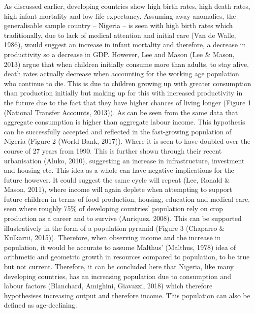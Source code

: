 \documentclass[11pt, english]{article}
\begin{document}
	As discussed earlier, developing countries show high birth rates, high death rates, high infant mortality and low life expectancy. Assuming away anomalies, the generalisable sample country – Nigeria – is seen with high birth rates which traditionally, due to lack of medical attention and initial care (Van de Walle, 1986), would suggest an increase in infant mortality and therefore, a decrease in productivity so a decrease in GDP. However, Lee and Mason (Lee \& Mason, 2013) argue that when children initially consume more than adults, to stay alive, death rates actually decrease when accounting for the working age population who continue to die. This is due to children growing up with greater consumption than production initially but making up for this with increased productivity in the future due to the fact that they have higher chances of living longer (Figure 1 (National Transfer Accounts, 2013)). As can be seen from the same data that aggregate consumption is higher than aggregate labour income. This hypothesis can be successfully accepted and reflected in the fast-growing population of Nigeria (Figure 2 (World Bank, 2017)). Where it is seen to have doubled over the course of 27 years from 1990. This is further shown through their recent urbanisation (Aluko, 2010), suggesting an increase in infrastructure, investment and housing etc. This idea as a whole can have negative implications for the future however. It could suggest the same cycle will repeat (Lee, Ronald \& Mason, 2011), where income will again deplete when attempting to support future children in terms of food production, housing, education and medical care, seen where roughly 75\% of developing countries' population rely on crop production as a career and to survive (Anriquez, 2008). This can be supported illustratively in the form of a population pyramid (Figure 3 (Chaparro \& Kulkarni, 2015)). Therefore, when observing income and the increase in population, it would be accurate to assume Malthus' (Malthus, 1978) idea of arithmetic and geometric growth in resources compared to population, to be true but not current. Therefore, it can be concluded here that Nigeria, like many developing countries, has an increasing population due to consumption and labour factors (Blanchard, Amighini, Giavazzi, 2018) which therefore hypothesises increasing output and therefore income. This population can also be defined as age-declining.\\
\end{document}

